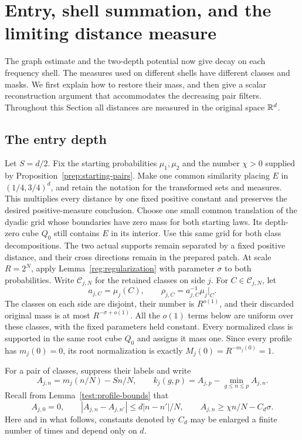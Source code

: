 \section{Entry, shell summation, and the limiting distance measure}
\label{asm:section}
\label{sec:assembly}

The graph estimate and the two-depth potential now give decay on each frequency
shell.  The measures used on different shells have different classes and
masks.  We first explain how to restore their mass, and then give a scalar
reconstruction argument that accommodates the decreasing pair filters.
Throughout this Section all distances are measured in the original
space $\mathbb R^d$.

\subsection{The entry depth}

Let $S=d/2$.  Fix the starting probabilities $\mu_1,\mu_2$ and the number
$\chi>0$ supplied by Proposition~\ref{prep:starting-pairs}.
Make one common similarity placing $E$ in $(1/4,3/4)^d$, and retain
the notation for the transformed sets and measures.  This multiplies
every distance by one fixed positive constant and preserves the
desired positive-measure conclusion.  Choose one small common
translation of the dyadic grid whose boundaries have zero mass for
both starting laws.  Its depth-zero cube $Q_0$ still contains $E$ in
its interior.  Use this same grid for both class decompositions.
The two actual supports remain separated by a fixed positive
distance, and their cross directions remain in the prepared patch.
At scale
$R=2^N$, apply Lemma~\ref{reg:regularization} with parameter $\sigma$ to
both probabilities.  Write $\mathcal C_{j,N}$ for the retained classes on
side $j$.  For $C\in\mathcal C_{j,N}$, let
\[
 a_{j,C}=\mu_j(C),\qquad
 \rho_{j,C}=a_{j,C}^{-1}\mu_j|_C.
\]
The classes on each side are disjoint, their number is $R^{o(1)}$, and
their discarded original mass is at most $R^{-\sigma+o(1)}$.  All the
$o(1)$ terms below are uniform over these classes, with the fixed
parameters held constant.
Every normalized class is supported in the same root cube $Q_0$ and
assigns it mass one.  Since every profile has $m_j(0)=0$, its root
normalization is exactly $M_j(0)=R^{-m_j(0)}=1$.

For a pair of classes, suppress their labels and write
\[
 A_{j,n}=m_j(n/N)-Sn/N,\qquad
 k_j(g,p)=A_{j,p}-\min_{g\le n\le p}A_{j,n}.
\]
Recall from Lemma~\ref{test:profile-bounds} that
\begin{equation}
 \label{asm:profile-input}
 A_{j,0}=0,\qquad
 |A_{j,n}-A_{j,n'}|\le d|n-n'|/N,\qquad
 A_{j,n}\ge\chi n/N-C_d\sigma.
\end{equation}
Here and in what follows, constants denoted by $C_d$ may be enlarged a
finite number of times and depend only on $d$.

